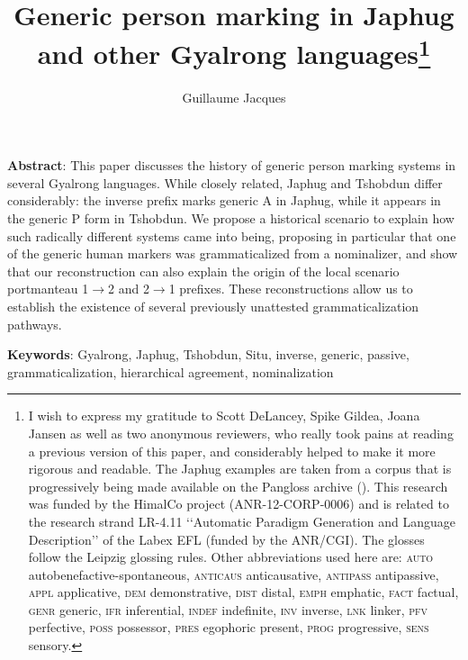 \documentclass[oldfontcommands,oneside,a4paper,11pt]{article}
\begin{document}
 
\title{Generic person marking in Japhug and other Gyalrong languages\footnote{I wish to express my gratitude to Scott DeLancey, Spike Gildea, Joana Jansen as well as two anonymous reviewers, who really took pains at reading a previous version of this paper, and considerably helped to make it more rigorous and readable. The Japhug examples are taken from a corpus that is progressively being made available on the Pangloss archive (\citealt{michailovsky14pangloss}).  This research was funded by the HimalCo project (ANR-12-CORP-0006) and is related to the research strand LR-4.11 ‘‘Automatic Paradigm Generation and Language Description’’ of the Labex EFL (funded by the ANR/CGI).  The glosses follow the Leipzig glossing rules. Other abbreviations used here are: \textsc{auto}  autobenefactive-spontaneous, \textsc{anticaus} anticausative, \textsc{antipass} antipassive, \textsc{appl} applicative, \textsc{dem} demonstrative,  \textsc{dist} distal, \textsc{emph} emphatic, \textsc{fact} factual, \textsc{genr} generic, \textsc{ifr} inferential, \textsc{indef} indefinite, \textsc{inv} inverse,  \textsc{lnk} linker, \textsc{pfv} perfective, \textsc{poss} possessor, \textsc{pres} egophoric present, \textsc{prog} progressive, \textsc{sens} sensory.}}
\author{Guillaume Jacques}
\maketitle

\textbf{Abstract}: This paper discusses the history of generic person marking systems in several Gyalrong languages. While closely related,  Japhug and Tshobdun differ considerably: the inverse prefix marks generic A in Japhug, while it appears  in the generic P form in Tshobdun. We propose  a historical scenario to explain how such radically different systems came into being, proposing in particular that one of the generic human markers was grammaticalized from a nominalizer, and show that our reconstruction can also explain the origin of the local scenario portmanteau 1$\rightarrow$2 and  2$\rightarrow$1 prefixes. These reconstructions allow us to establish the existence of several previously unattested grammaticalization pathways.

\textbf{Keywords}: Gyalrong, Japhug, Tshobdun, Situ, inverse, generic, passive, grammaticalization, hierarchical agreement, nominalization
 
 
\end{document}
